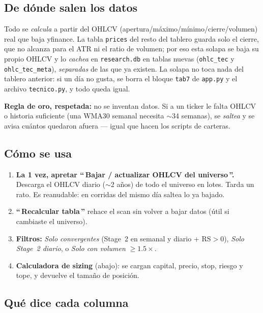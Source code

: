 \documentclass[11pt,a4paper]{article}
\newcommand{\code}[1]{\texttt{#1}}
\newcommand{\fpath}[1]{\texttt{#1}}
\begin{document}
\subsection{De d\'onde salen los datos}

Todo se \emph{calcula} a partir del OHLCV (apertura/m\'aximo/m\'inimo/cierre/volumen)
real que baja yfinance. La tabla \code{prices} del resto del tablero guarda solo el
cierre, que no alcanza para el ATR ni el ratio de volumen; por eso esta solapa se baja
su propio OHLCV y lo \emph{cachea} en \fpath{research.db} en tablas nuevas
(\code{ohlc\_tec} y \code{ohlc\_tec\_meta}), \emph{separadas} de las que ya existen.
La solapa no toca nada del tablero anterior: si un d\'ia no gusta, se borra el bloque
\code{tab7} de \fpath{app.py} y el archivo \fpath{tecnico.py}, y todo queda igual.

\begin{regla}
\textbf{Regla de oro, respetada:} no se inventan datos. Si a un ticker le falta OHLCV
o historia suficiente (una WMA30 semanal necesita $\sim$34 semanas), se \emph{saltea}
y se avisa cu\'antos quedaron afuera --- igual que hacen los scripts de carteras.
\end{regla}

\subsection{C\'omo se usa}

\begin{enumerate}[leftmargin=1.4em]
  \item \textbf{La 1 vez, apretar ``\,Bajar / actualizar OHLCV del
  universo\,''.} Descarga el OHLCV diario ($\sim$2 a\~nos) de todo el universo en
  lotes. Tarda un rato. Es reanudable: en corridas del mismo d\'ia saltea lo ya
  bajado.
  \item \textbf{``\,Recalcular tabla\,''} rehace el scan sin volver a bajar datos
  (\'util si cambiaste el universo).
  \item \textbf{Filtros:} \emph{Solo convergentes} (Stage~2 en semanal y diario +
  RS$>$0), \emph{Solo Stage~2 diario}, o \emph{Solo con volumen} $\ge 1.5\times$.
  \item \textbf{Calculadora de sizing} (abajo): se cargan capital, precio, stop,
  riesgo y tope, y devuelve el tama\~no de posici\'on.
\end{enumerate}

\subsection{Qu\'e dice cada columna}
\end{document}

